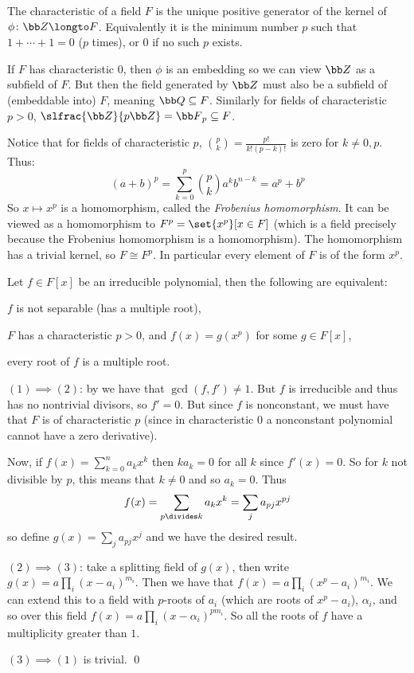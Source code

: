 \bdefn

    The {\emphcolor characteristic} of a field $F$ is the unique positive generator of the kernel of $\phi\colon{\bb Z}\longto F$.
    Equivalently it is the minimum number $p$ such that $1+\cdots+1=0$ ($p$ times), or $0$ if no such $p$ exists.

\edefn

If $F$ has characteristic $0$, then $\phi$ is an embedding so we can view ${\bb Z}$ as a subfield of $F$.
But then the field generated by ${\bb Z}$ must also be a subfield of (embeddable into) $F$, meaning ${\bb Q}\subseteq F$.
Similarly for fields of characteristic $p>0$, $\slfrac{\bb Z}{p{\bb Z}}={\bb F}_p\subseteq F$.

Notice that for fields of characteristic $p$, $\binom pk=\frac{p!}{k!(p-k)!}$ is zero for $k\neq0,p$.
Thus:
$$ (a+b)^p = \sum_{k=0}^p\binom pka^kb^{n-k} = a^p + b^p $$
So $x\mapsto x^p$ is a homomorphism, called the {\it Frobenius homomorphism}.
It can be viewed as a homomorphism to $F^p=\set{x^p}[x\in F]$ (which is a field precisely because the Frobenius homomorphism is a homomorphism).
The homomorphism has a trivial kernel, so $F\cong F^p$.
In particular every element of $F$ is of the form $x^p$.

\bthrm

    Let $f\in F[x]$ be an irreducible polynomial, then the following are equivalent:
    \benum
        \item $f$ is not separable (has a multiple root),
        \item $F$ has a characteristic $p>0$, and $f(x)=g(x^p)$ for some $g\in F[x]$,
        \item every root of $f$ is a multiple root.
    \eenum

\ethrm

\Proof $(1)\implies(2)$: by  we have that $\gcd(f,f')\neq1$.
But $f$ is irreducible and thus has no nontrivial divisors, so $f'=0$.
But since $f$ is nonconstant, we must have that $F$ is of characteristic $p$ (since in characteristic $0$ a nonconstant polynomial cannot have a zero derivative).

Now, if $f(x)=\sum_{k=0}^na_kx^k$ then $ka_k=0$ for all $k$ since $f'(x)=0$.
So for $k$ not divisible by $p$, this means that $k\neq0$ and so $a_k=0$.
Thus
$$ f(x) = \sum_{p\divides k}a_kx^k = \sum_ja_{pj}x^{pj} $$
so define $g(x)=\sum_ja_{pj}x^j$ and we have the desired result.

$(2)\implies(3)$: take a splitting field of $g(x)$, then write $g(x) = a\prod_i(x-a_i)^{m_i}$.
Then we have that $f(x)=a\prod_i(x^p-a_i)^{m_i}$.
We can extend this to a field with $p$-roots of $a_i$ (which are roots of $x^p-a_i$), $\alpha_i$, and so over this field $f(x)=a\prod_i(x-\alpha_i)^{pm_i}$.
So all the roots of $f$ have a multiplicity greater than $1$.

$(3)\implies(1)$ is trivial.
\qed

